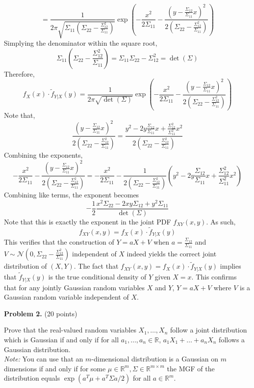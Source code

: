 \documentclass{article}
\begin{document}
\begin{enumerate}
{$$= \frac{1}{2\pi\sqrt{\Sigma_{11}\left(\Sigma_{22} - \frac{\Sigma_{12}^2}{\Sigma_{11}}\right)}}\exp\left(-\frac{x^2}{2\Sigma_{11}} - \frac{(y-\frac{\Sigma_{12}}{\Sigma_{11}}x)^2}{2\left(\Sigma_{22} - \frac{\Sigma_{12}^2}{\Sigma_{11}}\right)}\right)$$
Simplying the denominator within the square root,
$$\Sigma_{11}\left(\Sigma_{22} - \frac{\Sigma_{12}^2}{\Sigma_{11}}\right) = \Sigma_{11}\Sigma_{22} - \Sigma_{12}^2 = \det(\Sigma)$$
Therefore,
$$f_X(x) \cdot \tilde{f}_{Y|X}(y) = \frac{1}{2\pi\sqrt{\det(\Sigma)}}\exp\left(-\frac{x^2}{2\Sigma_{11}} - \frac{(y-\frac{\Sigma_{12}}{\Sigma_{11}}x)^2}{2\left(\Sigma_{22} - \frac{\Sigma_{12}^2}{\Sigma_{11}}\right)}\right)$$
Note that,
$$\frac{(y-\frac{\Sigma_{12}}{\Sigma_{11}}x)^2}{2\left(\Sigma_{22} - \frac{\Sigma_{12}^2}{\Sigma_{11}}\right)} = \frac{y^2 - 2y\frac{\Sigma_{12}}{\Sigma_{11}}x + \frac{\Sigma_{12}^2}{\Sigma_{11}^2}x^2}{2\left(\Sigma_{22} - \frac{\Sigma_{12}^2}{\Sigma_{11}}\right)}$$
Combining the exponents,
$$-\frac{x^2}{2\Sigma_{11}} - \frac{(y-\frac{\Sigma_{12}}{\Sigma_{11}}x)^2}{2\left(\Sigma_{22} - \frac{\Sigma_{12}^2}{\Sigma_{11}}\right)} = -\frac{x^2}{2\Sigma_{11}} - \frac{1}{2\left(\Sigma_{22} - \frac{\Sigma_{12}^2}{\Sigma_{11}}\right)}\left(y^2 - 2y\frac{\Sigma_{12}}{\Sigma_{11}}x + \frac{\Sigma_{12}^2}{\Sigma_{11}^2}x^2\right)$$
Combining like terms, the exponent becomes
$$-\frac{1}{2}\frac{x^2\Sigma_{22} - 2xy\Sigma_{12} + y^2\Sigma_{11}}{\det(\Sigma)}$$
Note that this is exactly the exponent in the joint PDF $f_{XY}(x,y)$. 
As such,
$$f_{XY}(x,y) = f_X(x) \cdot \tilde{f}_{Y|X}(y)$$
This verifies that the construction of $Y = aX + V$ when $a = \frac{\Sigma_{12}}{\Sigma_{11}}$ and $V \sim \mathcal{N}\left(0, \Sigma_{22} - \frac{\Sigma_{12}^2}{\Sigma_{11}}\right)$ independent of $X$ indeed yields the correct joint distribution of $(X,Y)$.
The fact that $f_{XY}(x,y) = f_X(x) \cdot \tilde{f}_{Y|X}(y)$ implies that $\tilde{f}_{Y|X}(y)$ is the true conditional density of $Y$ given $X=x$. This confirms that for any jointly Gaussian random variables $X$ and $Y$, $Y = aX + V$ where $V$ is a Gaussian random variable independent of $X$.
    }

\end{enumerate}

\textbf{Problem 2.} (20 points)

Prove that the real-valued random variables $X_1, \dots, X_n$ follow
a joint distribution which is Gaussian if and only if for all $a_1,
\dots, a_n \in \mathbb{R}$, $a_1 X_1 + \dots + a_n X_n$ follows a
Gaussian distribution. \\
\textit{Note:} You can use that an $m$-dimensional distribution is a
Gaussian on $m$ dimensions if and only if for some $\mu \in
\mathbb{R}^m, \Sigma \in \mathbb{R}^{m \times m}$ the MGF of the
distribution equals $\exp\left( a^T \mu + a^T \Sigma a / 2 \right)$
for all $a \in \mathbb{R}^m$.
\end{document}
